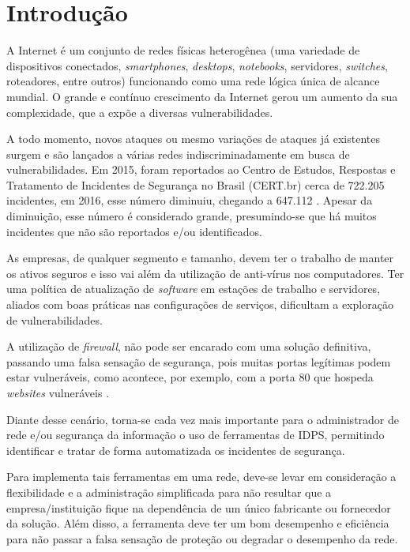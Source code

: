\chapter{Introdução} \label{ch:introdução}

A Internet é um conjunto de redes físicas heterogênea (uma variedade de dispositivos conectados, \textit{smartphones}, \textit{desktops}, \textit{notebooks}, servidores, \textit{switches}, roteadores, entre outros) funcionando como uma rede lógica única de alcance mundial. O grande e contínuo crescimento da Internet gerou um aumento da sua complexidade, que a expõe a diversas vulnerabilidades. 

A todo momento, novos ataques ou mesmo variações de ataques já existentes surgem e são lançados a várias redes indiscriminadamente em busca de vulnerabilidades. Em 2015, foram reportados ao Centro de Estudos, Respostas e Tratamento de Incidentes de Segurança no Brasil (CERT.br) cerca de 722.205 incidentes, em 2016, esse número diminuiu, chegando a 647.112 \cite{estatistica:cert.br}. Apesar da diminuição, esse número é considerado grande, presumindo-se que há muitos incidentes que não são reportados e/ou identificados.

As empresas, de qualquer segmento e tamanho, devem ter o trabalho de manter os ativos seguros e isso vai além da utilização de anti-vírus nos computadores. Ter uma política de atualização de \textit{software} em estações de trabalho e servidores, aliados com boas práticas nas configurações de serviços, dificultam a exploração de vulnerabilidades. 

A utilização de \textit{firewall}, não pode ser encarado com uma solução definitiva, passando uma falsa sensação de segurança, pois muitas portas legítimas podem estar vulneráveis, como acontece, por exemplo, com a porta 80 que hospeda \textit{websites} vulneráveis \cite{analisenessus:cleriston}.

Diante desse cenário, torna-se cada vez mais importante para o administrador de rede e/ou segurança da informação o uso de ferramentas de IDPS, permitindo identificar e tratar de forma automatizada os incidentes de segurança.

Para implementa tais ferramentas em uma rede, deve-se levar em consideração a flexibilidade e a administração simplificada para não resultar que a empresa/instituição fique na dependência de um único fabricante ou fornecedor da solução. Além disso, a ferramenta deve ter um bom desempenho e eficiência para não passar a falsa sensação de proteção ou degradar o desempenho da rede.

